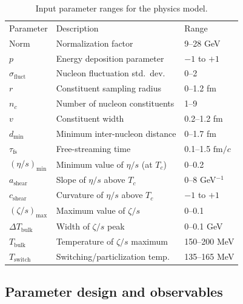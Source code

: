 \documentclass[aps,prc,reprint,amsmath,nofootinbib]{revtex4-1}
\newcommand{\fmc}{\ensuremath{\text{fm}/c}}
\newcommand{\sigmaf}{\sigma_\text{fluct}}
\newcommand{\taufs}{\tau_\text{fs}}
\newcommand{\dmin}{d_\text{min}}
\newcommand{\Tsw}{T_\text{switch}}
\newcommand{\smin}{{(\eta/s)_\mathrm{min}}}
\newcommand{\sslope}{{a_\mathrm{shear}}}
\newcommand{\scrv}{{c_\mathrm{shear}}}
\newcommand{\bmax}{{(\zeta/s)_\mathrm{max}}}
\newcommand{\bloc}{{T_\text{bulk}}}
\newcommand{\bwidth}{{\Delta T_\text{bulk}}}
\newcommand{\paddedhline}{\noalign{\smallskip}\hline\noalign{\smallskip}}
\begin{document}
\begin{table}[t]
  \caption{Input parameter ranges for the physics model.}
  \begin{ruledtabular}
  \begin{tabular}{lll}
    Parameter         & Description                        & Range             \\
    \paddedhline
    Norm              & Normalization factor                 & 9--28 GeV       \\
    $p$               & Energy deposition parameter         & $-1$ to $+1$     \\
    $\sigmaf$         & Nucleon fluctuation std.\ dev.\      & 0--2            \\
    $r$               & Constituent sampling radius          & 0--1.2 fm       \\
    $n_c$             & Number of nucleon constituents       & 1--9            \\
    $v$               & Constituent width                    & 0.2--1.2 fm     \\
    $\dmin$           & Minimum inter-nucleon distance       & 0--1.7 fm       \\
    $\taufs$          & Free-streaming time                  & 0.1--1.5 \fmc   \\
    $\smin$           & Minimum value of $\eta/s$ (at $T_c$) & 0--0.2          \\
    $\sslope$         & Slope of $\eta/s$ above $T_c$        & 0--8 GeV$^{-1}$ \\
    $\scrv$           & Curvature of $\eta/s$ above $T_c$    & $-1$ to $+1$    \\
    $\bmax$           & Maximum value of $\zeta/s$           & 0--0.1          \\
    $\bwidth$         & Width of $\zeta/s$ peak              & 0--0.1 GeV      \\
    $\bloc$           & Temperature of $\zeta/s$ maximum     & 150--200 MeV    \\
    $\Tsw$            & Switching/particlization temp.       & 135--165 MeV    \\
  \end{tabular}
  \end{ruledtabular}
  \label{tab:design}
\end{table}


\subsection{Parameter design and observables}
\label{sec:observables}
\end{document}
